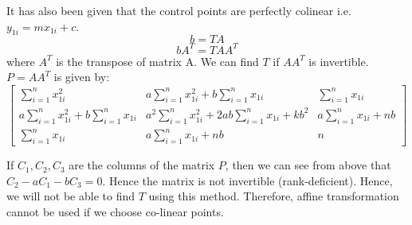 \documentclass[12pt]{article}
\begin{document}
It has also been given that the control points are perfectly colinear i.e. $y_{1i} = mx_{1i}+c$. 
\[b = TA\]
\[bA^T = TAA^T\]
where $A^T$ is the transpose of matrix A. We can find $T$ if $AA^T$ is invertible. $P = AA^T$ is given by:
\[
    \begin{bmatrix}
        \sum_{i=1}^nx_{1i}^2 & a\sum_{i=1}^nx_{1i}^2 + b\sum_{i=1}^nx_{1i} & \sum_{i=1}^nx_{1i}\\
        a\sum_{i=1}^nx_{1i}^2 + b\sum_{i=1}^nx_{1i} &  a^2\sum_{i=1}^nx_{1i}^2 + 2ab\sum_{i=1}^nx_{1i} + kb^2 & a\sum_{i=1}^nx_{1i} + nb\\
        \sum_{i=1}^nx_{1i} & a\sum_{i=1}^nx_{1i} + nb & n
    \end{bmatrix}
\]

If $C_1, C_2, C_3$ are the columns of the matrix $P$, then we can see from above that $C_2 - aC_1 - bC_3 = 0$. Hence the matrix is not invertible (rank-deficient). Hence, we will not be able to find $T$ using this method. Therefore, affine transformation cannot be used if we choose co-linear points.
\end{document}

